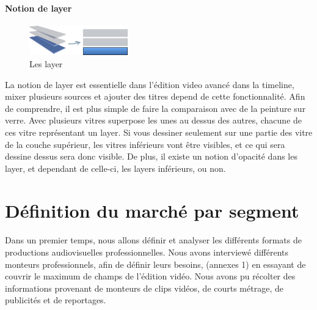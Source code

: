 \paragraph{}
\paragraph{Notion de layer}
  \begin{figure}
    \begin{center}
      \vspace{-20pt}
      \includegraphics[width=0.38\textwidth]{images/layers}
    \end{center}
    \vspace{-20pt}
    \caption{Les layer}
    \label{Yes}
  \end{figure}
La notion de layer est essentielle dans l'édition video avancé dans la
timeline, mixer plusieurs sources et ajouter des titres depend de cette
fonctionnalité. Afin de comprendre, il est plus simple de faire la comparaison
avec de la peinture sur verre. Avec plusieurs vitres superpose les unes au
dessus des autres, chacune de ces vitre représentant un layer. Si vous
dessiner seulement sur une partie des vitre de la couche supérieur, les vitres
inférieurs vont être visibles, et ce qui sera dessine dessus sera donc visible.
De plus, il existe un notion d'opacité dans les layer, et dependant de celle-ci,
les layers inférieurs, ou non.

\newpage
\section{Définition du marché par segment}
\paragraph{}
Dans un premier temps, nous allons définir et analyser les
différents formats de productions audiovisuelles professionnelles.
Nous avons interviewé
différents monteurs professionnels, afin de définir leurs besoins,
(annexes 1) en essayant de
couvrir le maximum de champs de l'édition vidéo. Nous
avons pu récolter des informations provenant de monteurs de clips
vidéos, de courts métrage, de publicités et de reportages.

